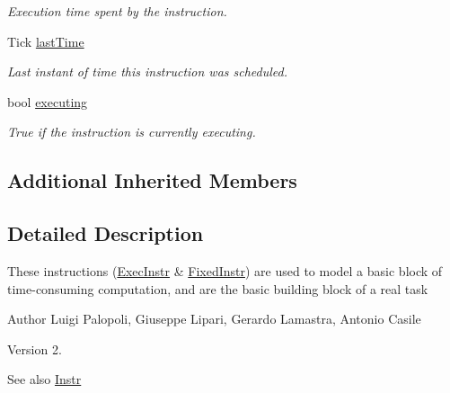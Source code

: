 \begin{DoxyCompactItemize}
\begin{DoxyCompactList}\small\item\em Execution time spent by the instruction. \end{DoxyCompactList}\item 
Tick \hyperlink{classRTSim_1_1ExecInstr_a7865329ba4b87921ae575ed3d095a67f}{last\+Time}\hypertarget{classRTSim_1_1ExecInstr_a7865329ba4b87921ae575ed3d095a67f}{}\label{classRTSim_1_1ExecInstr_a7865329ba4b87921ae575ed3d095a67f}

\begin{DoxyCompactList}\small\item\em Last instant of time this instruction was scheduled. \end{DoxyCompactList}\item 
bool \hyperlink{classRTSim_1_1ExecInstr_aa6051a6e5e1941bc2c0febb7d2e94cc4}{executing}\hypertarget{classRTSim_1_1ExecInstr_aa6051a6e5e1941bc2c0febb7d2e94cc4}{}\label{classRTSim_1_1ExecInstr_aa6051a6e5e1941bc2c0febb7d2e94cc4}

\begin{DoxyCompactList}\small\item\em True if the instruction is currently executing. \end{DoxyCompactList}\end{DoxyCompactItemize}
\subsection*{Additional Inherited Members}


\subsection{Detailed Description}
These instructions (\hyperlink{classRTSim_1_1ExecInstr}{Exec\+Instr} \& \hyperlink{classRTSim_1_1FixedInstr}{Fixed\+Instr}) are used to model a basic block of time-\/consuming computation, and are the basic building block of a real task

\begin{DoxyAuthor}{Author}
Luigi Palopoli, Giuseppe Lipari, Gerardo Lamastra, Antonio Casile 
\end{DoxyAuthor}
\begin{DoxyVersion}{Version}
2. 
\end{DoxyVersion}
\begin{DoxySeeAlso}{See also}
\hyperlink{classRTSim_1_1Instr}{Instr} 
\end{DoxySeeAlso}


